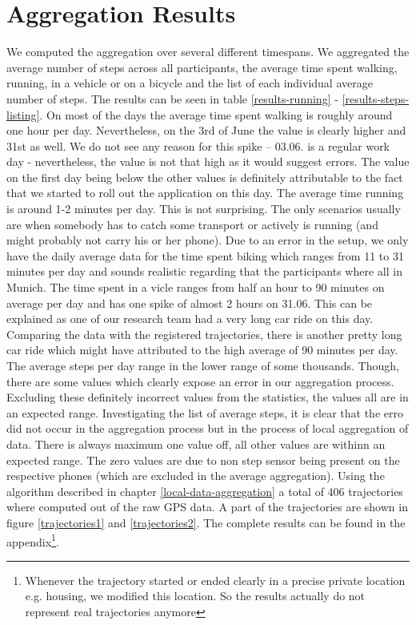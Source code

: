 \section{Aggregation Results}\label{results}
We computed the aggregation over several different timespans. We aggregated the average number of steps across all participants, the average time spent walking, running, in a vehicle or on a bicycle and the list of each individual average number of steps. The results can be seen in table \ref{results-running} - \ref{results-steps-listing}.
On most of the days the average time spent walking is roughly around one hour per day. Nevertheless, on the 3rd of June the value is clearly higher and 31st as well. We do not see any reason for this spike -- 03.06. is a regular work day - nevertheless, the value is not that high as it would suggest errors. The value on the first day being below the other values is definitely attributable to the fact that we started to roll out the application on this day.
The average time running is around 1-2 minutes per day. This is not surprising. The only scenarios usually are when somebody has to catch some transport or actively is running (and might probably not carry his or her phone).
Due to an error in the setup, we only have the daily average data for the time spent biking which ranges from 11 to 31 minutes per day and sounds realistic regarding that the participants where all in Munich.
The time spent in a  vicle ranges from half an hour to 90 minutes on average per day and has one spike of almost 2 hours on 31.06. This can be explained as one of our research team had a very long car ride on this day. Comparing the data with the registered trajectories, there is another pretty long car ride which might have attributed to the high average of 90 minutes per day. 
The average steps per day range in the lower range of some thousands. Though, there are some values which clearly expose an error in our aggregation process. Excluding these definitely incorrect values from the statistics, the values all are in an expected range. 
Investigating the list of average steps, it is clear that the erro did not occur in the aggregation process but in the process of local aggregation of data. There is always maximum one value off, all other values are withinn an expected range. The zero values are due to non step sensor being present on the respective phones (which are excluded in the average aggregation).
Using the algorithm described in chapter \ref{local-data-aggregation} a total of 406 trajectories where computed out of the raw GPS data. A part of the trajectories are shown in figure \ref{trajectories1} and \ref{trajectories2}. The complete results can be found in the appendix\footnote{Whenever the trajectory started or ended clearly in a precise private location e.g. housing, we modified this location. So the results actually do not represent real trajectories anymore}.

